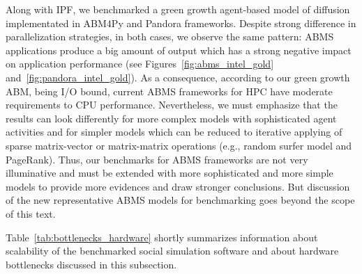 Along  with IPF,
we benchmarked a green growth agent-based model of diffusion implementated in \textsf{ABM4Py} and \textsf{Pandora} frameworks.
Despite strong difference in parallelization  strategies,
in  both  cases,  we  observe  the same pattern:
ABMS  applications produce  a  big  amount  of  output  which  has  a  strong  negative  impact  on  application performance
(see Figures~\ref{fig:abms_intel_gold} and~\ref{fig:pandora_intel_gold}).
As a consequence, according to our green growth ABM, being I/O bound,
current ABMS frameworks for HPC have moderate requirements to CPU performance.
Nevertheless, we must emphasize that the results can look differently for
more complex models with sophisticated agent activities
and for simpler models which can be reduced to iterative applying of sparse matrix-vector or matrix-matrix operations
(e.g., random surfer model and PageRank).
Thus, our benchmarks for ABMS frameworks are not very illuminative
and must  be  extended  with  more sophisticated and more simple models to provide more evidences and draw stronger conclusions.
But discussion of the new representative ABMS models for benchmarking goes beyond the scope of this text.

Table~\ref{tab:bottlenecks_hardware} shortly summarizes information about scalability of the benchmarked social simulation software
and about hardware bottlenecks discussed in this subsection.





